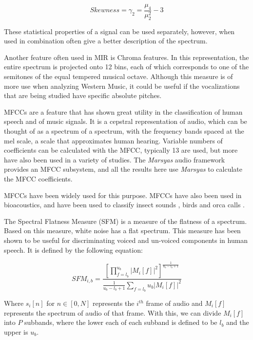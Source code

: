 \documentclass[12pt,oneside]{book}
\begin{document}
\begin{equation} 
Skewness = \gamma_2 = \frac{\mu_4}{\mu_2^2} - 3 
\end{equation}

\noindent These statistical properties of a signal can be used separately,
however, when used in combination often give a better description of
the spectrum.

Another feature often used in MIR is Chroma features.  In this
representation, the entire spectrum is projected onto 12 bins, each of
which corresponds to one of the semitones of the equal tempered
musical octave.  Although this measure is of more use when analyzing
Western Music, it could be useful if the vocalizations that are being
studied have specific absolute pitches.

MFCCs are a feature that has shown great utility in the classification
of human speech and of music signals.  It is a cepstral representation
of audio, which can be thought of as a spectrum of a spectrum, with
the frequency bands spaced at the mel scale, a scale that approximates
human hearing.  Variable numbers of coefficients can be calculated
with the MFCC, typically 13 are used, but more have also been used in
a variety of studies.  The \textit{Marsyas} audio framework provides an MFCC
subsystem, and all the results here use \textit{Marsyas} to calculate the MFCC
coefficients.

MFCCs \cite{logan2000mfcc} have been widely used for this purpose.
MFCCs have also been used in bioacoustics, and have been used to
classify insect sounds \cite{leqing2011insect}, birds
\cite{changhsing2007automatic} and orca calls \cite{ness2008chants}.

The Spectral Flatness Measure (SFM) \cite{hosseinzadeh2007mfcc} is a
measure of the flatness of a spectrum.  Based on this measure, white noise
has a flat spectrum.  This measure has been shown to be useful for
discriminating voiced and un-voiced components in human speech.  It is
defined by the following equation:

\begin{equation} 
SFM_{i,b} =  \frac{[\prod_{f=l_b}^{u_b} {|M_i [f]|}^2]^\frac{1}{u_b - l_b + 1}}
	{\frac{1}{u_b - l_b + 1}\sum_{f=l_b}{u_b} {|M_i[f]|^2}} 
\end{equation}

\noindent Where $s_i[n]$ for $n \in [0,N]$ represents the $i^{th}$ frame of
audio and $M_i[f]$ represents the spectrum of audio of that frame.
With this, we can divide $M_i[f]$ into $P$ subbands, where the lower
each of each subband is defined to be $l_b$ and the upper is $u_b$.
\end{document}
